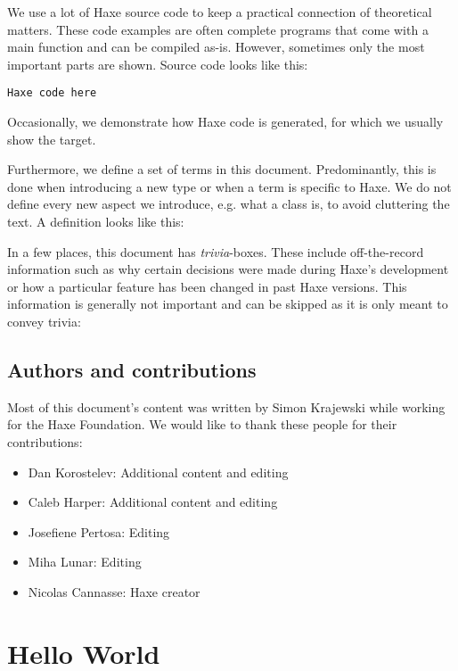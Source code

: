 We use a lot of Haxe source code to keep a practical connection of theoretical matters. These code examples are often complete programs that come with a main function and can be compiled as-is. However, sometimes only the most important parts are shown.
Source code looks like this:

\begin{lstlisting}
Haxe code here
\end{lstlisting}
Occasionally, we demonstrate how Haxe code is generated, for which we usually show the  target.

Furthermore, we define a set of terms in this document. Predominantly, this is done when introducing a new type or when a term is specific to Haxe. We do not define every new aspect we introduce, e.g. what a class is, to avoid cluttering the text. A definition looks like this:


In a few places, this document has \emph{trivia}-boxes. These include off-the-record information such as why certain decisions were made during Haxe's development or how a particular feature has been changed in past Haxe versions. This information is generally not important and can be skipped as it is only meant to convey trivia:


\subsection{Authors and contributions}
\label{introduction-authors-and-contributions}

Most of this document's content was written by Simon Krajewski while working for the Haxe Foundation. We would like to thank these people for their contributions:

\begin{itemize}
	\item Dan Korostelev: Additional content and editing
	\item Caleb Harper: Additional content and editing
	\item Josefiene Pertosa: Editing
	\item Miha Lunar: Editing
	\item Nicolas Cannasse: Haxe creator
\end{itemize}



\section{Hello World}
\label{introduction-hello-world}

